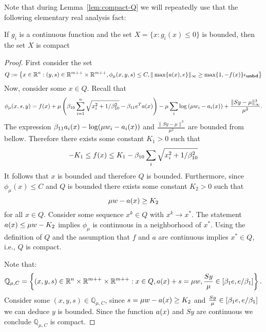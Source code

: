 \documentclass{article}
\begin{document}
Note that during Lemma~\ref{lem:compact-Q} we will repeatedly use that the following elementary real analysis fact: 

\begin{fact}
If $g_i$ is a continuous function and the set $X = \{ x : g_i(x) \le 0 \}$ is bounded, then the set $X$ is compact
\end{fact}

\lemCompactQ*

\begin{proof}
First consider the set
$$
Q := \left\{ x \in \mathbb{R}^{n} : (y, s) \in \mathbb{R}^{m++} \times \mathbb{R}^{m++}, \phi_{\mu}(x,y,s) \le C, \| \max\{ a(x), e \} \|_{\infty} \ge \max\{1,-f(x) \} \epsilon_{\textbf{unbd}} \right\} 
$$
Now, consider some $x \in Q$. Recall that
$$
\phi_{\mu}(x, s, y) = f(x) + \mu \left( \beta_{10} \sum_{i = 1}^{n} \sqrt{x_i^2 + 1 / \beta_{10}^2} - \beta_{11} e^T a(x) \right)  - \mu  \sum_i{ \log \left( \mu w_i - a_i(x)  \right) } + \frac{\| S y - \mu \|_{\infty}^3}{\mu^2}.
$$
The expression $\beta_{11} a_i(x) - \log(\mu w_i - a_i(x))$ and $\frac{\| S y - \mu \|^3}{\mu^2}$ are bounded from bellow. Therefore there exists some constant $K_{1} > 0$ such that
$$
-K_{1} \le f(x) \le K_{1} - \beta_{10} \sum_{i}{\sqrt{x_i^2 + 1 / \beta_{10}^2}}
$$
It follows that $x$ is bounded and therefore $Q$ is bounded. Furthermore, since $\phi_{\mu}(x) \le C$ and $Q$ is bounded there exists some constant $K_{2} > 0$ such that
$$
\mu w - a(x) \ge K_{2}
$$
for all $x \in Q$. Consider some sequence $x^{k} \in Q$ with $x^{k} \rightarrow x^{*}$. The statement $a(x) \le \mu w - K_{2}$ implies $\phi_{\mu}$ is continuous in a neighborhood of $x^{*}$. Using the definition of $Q$ and the assumption that $f$ and $a$ are continuous implies $x^{*} \in Q$, i.e., $Q$ is compact. 


Note that:
$$
\mathbb{Q}_{\mu, C} = \left\{ (x,y,s) \in \mathbb{R}^{n} \times \mathbb{R}^{m++} \times \mathbb{R}^{m++} : x \in Q, a(x) + s = \mu w, \frac{S y}{\mu} \in [\beta_{1} e, e / \beta_{1}]\right\}.
$$
Consider some $(x,y,s) \in \mathbb{Q}_{\mu, C}$, since $s = \mu w - a(x) \ge K_{2}$ and $\frac{S y}{\mu} \in [\beta_{1} e, e / \beta_{1}]$ we can deduce $y$ is bounded. Since the function $a(x)$ and $S y$ are continuous we conclude $\mathbb{Q}_{\mu, C}$ is compact.
\end{proof}
\end{document}
